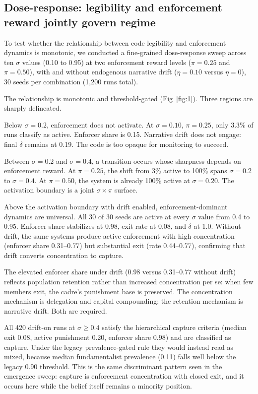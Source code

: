 \documentclass[12pt]{article}
\begin{document}
\subsection{Dose-response: legibility and enforcement reward jointly govern regime}
\label{subsec:dose}

To test whether the relationship between code legibility and enforcement dynamics is monotonic, we conducted a fine-grained dose-response sweep across ten $\sigma$ values (0.10 to 0.95) at two enforcement reward levels ($\pi = 0.25$ and $\pi = 0.50$), with and without endogenous narrative drift ($\eta = 0.10$ versus $\eta = 0$), 30 seeds per combination (1,200 runs total).

The relationship is monotonic and threshold-gated (Fig~\ref{fig:1}). Three regions are sharply delineated.

Below $\sigma = 0.2$, enforcement does not activate. At $\sigma = 0.10$, $\pi = 0.25$, only 3.3\% of runs classify as active. Enforcer share is 0.15. Narrative drift does not engage: final $\delta$ remains at 0.19. The code is too opaque for monitoring to succeed.

Between $\sigma = 0.2$ and $\sigma = 0.4$, a transition occurs whose sharpness depends on enforcement reward. At $\pi = 0.25$, the shift from 3\% active to 100\% spans $\sigma = 0.2$ to $\sigma = 0.4$. At $\pi = 0.50$, the system is already 100\% active at $\sigma = 0.20$. The activation boundary is a joint $\sigma \times \pi$ surface.

Above the activation boundary with drift enabled, enforcement-dominant dynamics are universal. All 30 of 30 seeds are active at every $\sigma$ value from 0.4 to 0.95. Enforcer share stabilizes at 0.98, exit rate at 0.08, and $\delta$ at 1.0. Without drift, the same systems produce active enforcement with high concentration (enforcer share 0.31--0.77) but substantial exit (rate 0.44--0.77), confirming that drift converts concentration to capture.

The elevated enforcer share under drift (0.98 versus 0.31--0.77 without drift) reflects population retention rather than increased concentration per se: when few members exit, the cadre's punishment base is preserved. The concentration mechanism is delegation and capital compounding; the retention mechanism is narrative drift. Both are required.

All 420 drift-on runs at $\sigma \geq 0.4$ satisfy the hierarchical capture criteria (median exit 0.08, active punishment 0.20, enforcer share 0.98) and are classified as capture. Under the legacy prevalence-gated rule they would instead read as mixed, because median fundamentalist prevalence (0.11) falls well below the legacy 0.90 threshold. This is the same discriminant pattern seen in the emergence sweep: capture is enforcement concentration with closed exit, and it occurs here while the belief itself remains a minority position.
\end{document}
